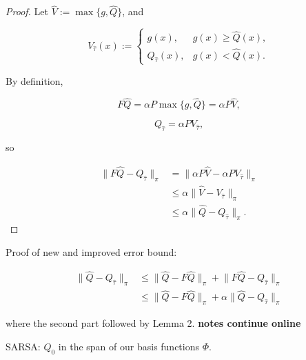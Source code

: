 \begin{proof}

Let \(\hat{V} := \max\{g, \hat{Q}\}\), and 

\[
V_{\hat{\tau}}(x) := \begin{cases}
g(x), & g(x) \geq \hat{Q}(x), \\
Q_{\hat{\tau}}(x), & g(x) < \hat{Q}(x).
\end{cases}
\]

By definition,

\[
F \hat{Q} = \alpha P \max\{g, \hat{Q}\} = \alpha P \hat{V},
\]

\[
Q_{\hat{\tau}} = \alpha P V_{\hat{\tau}},
\]

so

\begin{align*}
\lVert F \hat{Q} - Q_{\hat{\tau}} \rVert_\pi & = \lVert \alpha P \hat{V} - \alpha P V_{\hat{\tau}} \rVert_\pi \\
 & \leq \alpha \lVert \hat{V} - V_{\hat{\tau}} \rVert_\pi
\\ & \leq \alpha \lVert \hat{Q} - Q_{\hat{\tau}} \rVert_\pi.
\end{align*}



\end{proof}


Proof of new and improved error bound:

\begin{align*}
\lVert \hat{Q} - Q_{\hat{\tau}} \rVert_\pi & \leq \lVert \hat{Q} - F \hat{Q} \rVert_\pi + \lVert F \hat{Q} - Q_{\hat{\tau}} \rVert_\pi
\\ & \leq \lVert \hat{Q} - F \hat{Q} \rVert_\pi + \alpha \lVert \hat{Q} - Q_{\hat{\tau}} \rVert_\pi
\end{align*}

where the second part followed by Lemma 2. \textbf{notes continue online}


SARSA: \(Q_0\) in the span of our basis functions \(\Phi\).



